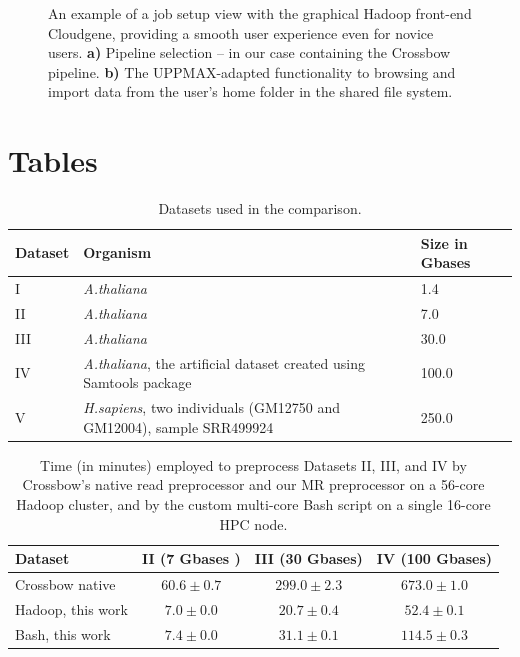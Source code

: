 \documentclass[10pt]{article}
\begin{document}
\begin{figure}[!ht]
\begin{subfigure}[b]{0.6\textwidth}
		\subcaption{}
	\end{subfigure}
	\caption{%
	An example of a job setup view with the graphical Hadoop front-end Cloudgene,
	providing a smooth user experience even for novice users. \textbf{a)} Pipeline
	selection -- in our case containing the Crossbow pipeline. \textbf{b)} The
	UPPMAX-adapted functionality to browsing and import data from the user's home
	folder in the shared file system.
	}
	\label{fig:fig4}
\end{figure}



\section*{Tables}

\begin{table}[!ht]
\small
\footnotesize
\caption{Datasets used in the comparison. }
\begin{center}
\begin{tabular}{|l|l|l|}
Dataset &	Organism &	Size in Gbases\\
\hline
 I		&	{\it A.thaliana}	&	1.4	\\
 II	&	{\it A.thaliana}	&	7.0\\
 III	&	{\it A.thaliana}	&	30.0	\\
 IV	&{\it A.thaliana}, the artificial dataset created using Samtools package	&	100.0	\\
 V	&	{\it H.sapiens}, two individuals (GM12750 and GM12004), sample SRR499924		&	250.0\\

\end{tabular}
\end{center}
\label{table:datasets}
\normalsize
\end{table}%


\begin{table}[!ht]
\small
\caption{%
	Time (in minutes) employed to preprocess Datasets II, III, and IV by
	Crossbow's native read preprocessor and our MR preprocessor on a 56-core Hadoop
	cluster, and by the custom multi-core Bash script on a single 16-core HPC node.
	}

\begin{center}
\begin{tabular}{l|c|c|c}
Dataset			&		II (7 Gbases )	& III (30 Gbases)	& IV (100 Gbases)\\
\hline
Crossbow native			&		$60.6\pm0.7$	& $299.0\pm2.3$	&	$673.0\pm1.0$	\\
Hadoop, this work			&		$7.0\pm0.0$	&	$20.7\pm0.4$&		$52.4\pm0.1$\\
Bash, this work			& 		$7.4\pm0.0$	&	$31.1\pm0.1$	&	$114.5\pm0.3$	\\
\end{tabular}
\end{center}
\label{table:preprocess}
\normalsize
\end{table}%
\end{document}
